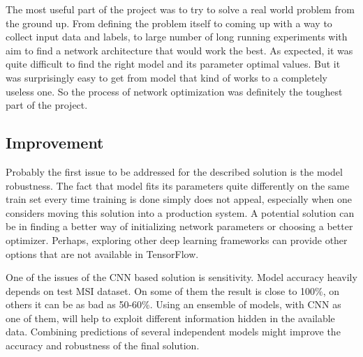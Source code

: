 \documentclass[a4paper]{article}
\begin{document}
    The most useful part of the project was to try to solve a real world problem from the ground up.
    From defining the problem itself to coming up with a way to collect input data and labels,
    to large number of long running experiments with aim to find a network architecture that would work the best.
    As expected, it was quite difficult to find the right model and its parameter optimal values.
    But it was surprisingly easy to get from model that kind of works to a completely useless one.
    So the process of network optimization was definitely the toughest part of the project.
    
    \subsection*{Improvement}
    
    Probably the first issue to be addressed for the described solution is the model robustness.
    The fact that model fits its parameters quite differently on the same train set every time
    training is done simply does not appeal, especially when one considers moving this solution
    into a production system. A potential solution can be in finding a better
    way of initializing network parameters or choosing a better optimizer.
    Perhaps, exploring other deep learning frameworks
    can provide other options that are not available in TensorFlow.
    
    One of the issues of the CNN based solution is sensitivity.
    Model accuracy heavily depends on test MSI dataset.
    On some of them the result is close to 100\%, on others it can be as bad as 50-60\%.
    Using an ensemble of models, with CNN as one of them,
    will help to exploit different information hidden in the available data.
    Combining predictions of several independent models might improve the accuracy and 
    robustness of the final solution.
    
    
\end{document}
